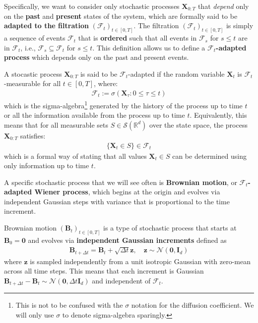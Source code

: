 \documentclass{article}
\newcommand{\boldtext}[1]{\textbf{\textcolor{MyGreen}{#1}}}
\begin{document}
Specifically, we want to consider only stochastic processes $\boldsymbol{X}_{0:T}$ that \textit{depend} only on the \textbf{past} and \textbf{present} states of the system, which are formally said to be \textbf{adapted to the filtration} $(\mathcal{F}_t)_{t\in [0,T]}$. The filtration $(\mathcal{F}_t)_{t\in [0,T]}$ is simply a sequence of events $\mathcal{F}_t$ that is \textbf{ordered} such that all events in $\mathcal{F}_s$ for $s\leq t$ are in $\mathcal{F}_t$, i.e., $\mathcal{F}_s \subseteq \mathcal{F}_t$ for $s\leq t$. This definition allows us to define a \boldtext{$\mathcal{F}_t$-adapted process} which depends only on the past and present events.

\begin{definition}\label{def:filtration-adapted-process}
A stocastic process $\boldsymbol{X}_{0:T}$ is said to be $\mathcal{F}_t$-adapted if the random variable $\boldsymbol{X}_t$ is $\mathcal{F}_t$-measurable for all $t\in [0,T]$, where:
\begin{align}
    \mathcal{F}_t:=\sigma(\boldsymbol{X}_\tau: 0\leq \tau\leq t)
\end{align}
which is the sigma-algebra\footnote{This is not to be confused with the $\sigma$ notation for the diffusion coefficient. We will only use $\sigma$ to denote sigma-algebra sparingly.} generated by the history of the process up to time $t$ or all the information available from the process up to time $t$. Equivalently, this means that for all measurable sets $S\in \mathcal{S}(\mathbb{R}^d)$ over the state space, the process $\boldsymbol{X}_{0:T}$ satisfies:
\begin{align}
    \{\boldsymbol{X}_t\in S\}\in \mathcal{F}_t
\end{align}
which is a formal way of stating that all values $\boldsymbol{X}_t\in S$ can be determined using only information up to time $t$.
\end{definition}

A specific stochastic process that we will see often is \boldtext{Brownian motion}, or \textbf{$\mathcal{F}_t$-adapted Wiener process}, which begins at the origin and evolves via independent Gaussian steps with variance that is proportional to the time increment.

\begin{definition}\label{def:brownian-motion}
Brownian motion $(\boldsymbol{B}_t)_{t\in [0,T]}$ is a type of stochastic process that starts at $\boldsymbol{B}_0=\boldsymbol{0}$ and evolves via \textbf{independent Gaussian increments} defined as
\begin{align}
    \boldsymbol{B}_{t+\Delta t}=\boldsymbol{B}_t+\sqrt{\Delta t}\boldsymbol{z}, \quad \boldsymbol{z}\sim \mathcal{N}(\boldsymbol{0}, \boldsymbol{I}_d)
\end{align}
where $\boldsymbol{z}$ is sampled independently from a unit isotropic Gaussian with zero-mean across all time steps. This means that each increment is Gaussian $\boldsymbol{B}_{t+\Delta t}-\boldsymbol{B}_t\sim \mathcal{N}(\boldsymbol{0}, \Delta t\boldsymbol{I}_d)$ and independent of $\mathcal{F}_t$. 
\end{definition}
\end{document}
